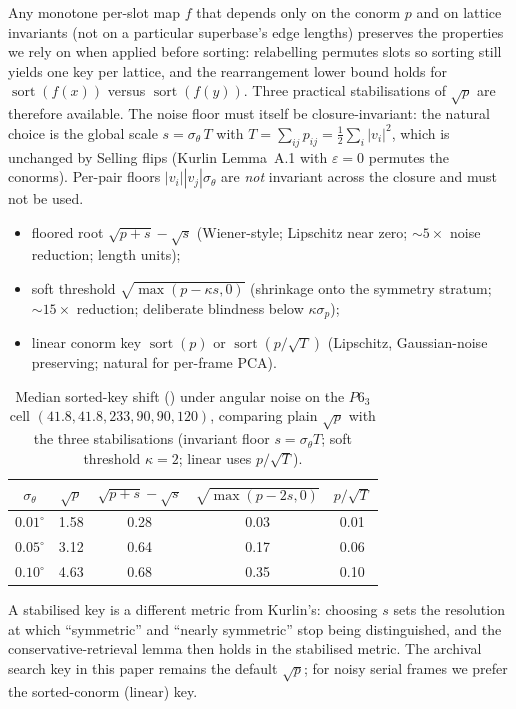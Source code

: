 \documentclass[11pt]{article}
\newcommand{\Ang}{\text{\AA}}
\begin{document}
Any monotone per-slot map $f$ that depends only on the conorm $p$ and on lattice invariants (not on a particular superbase's edge lengths) preserves the properties we rely on when applied before sorting: relabelling permutes slots so sorting still yields one key per lattice, and the rearrangement lower bound holds for $\operatorname{sort}(f(x))$ versus $\operatorname{sort}(f(y))$. Three practical stabilisations of $\sqrt{p}$ are therefore available. The noise floor must itself be closure-invariant: the natural choice is the global scale $s=\sigma_\theta\,T$ with $T=\sum_{ij}p_{ij}=\tfrac12\sum_i|v_i|^2$, which is unchanged by Selling flips (Kurlin Lemma~A.1 with $\varepsilon=0$ permutes the conorms). Per-pair floors $|v_i||v_j|\sigma_\theta$ are \emph{not} invariant across the closure and must not be used.
\begin{itemize}
\item floored root $\sqrt{p+s}-\sqrt{s}$ (Wiener-style; Lipschitz near zero; $\sim5\times$ noise reduction; length units);
\item soft threshold $\sqrt{\max(p-\kappa s,0)}$ (shrinkage onto the symmetry stratum; $\sim15\times$ reduction; deliberate blindness below $\kappa\sigma_p$);
\item linear conorm key $\operatorname{sort}(p)$ or $\operatorname{sort}(p/\sqrt{T})$ (Lipschitz, Gaussian-noise preserving; natural for per-frame PCA).
\end{itemize}
\begin{table}[h]
\centering
\caption{Median sorted-key shift (\Ang) under angular noise on the $P6_3$ cell $(41.8,41.8,233,90,90,120)$, comparing plain $\sqrt{p}$ with the three stabilisations (invariant floor $s=\sigma_\theta T$; soft threshold $\kappa=2$; linear uses $p/\sqrt{T}$).}
\begin{tabular}{ccccc}
\toprule
$\sigma_\theta$ & $\sqrt{p}$ & $\sqrt{p+s}-\sqrt{s}$ & $\sqrt{\max(p-2s,0)}$ & $p/\sqrt{T}$ \\
\midrule
$0.01^\circ$ & 1.58 & 0.28 & 0.03 & 0.01 \\
$0.05^\circ$ & 3.12 & 0.64 & 0.17 & 0.06 \\
$0.10^\circ$ & 4.63 & 0.68 & 0.35 & 0.10 \\
\bottomrule
\end{tabular}
\end{table}
A stabilised key is a different metric from Kurlin's: choosing $s$ sets the resolution at which ``symmetric'' and ``nearly symmetric'' stop being distinguished, and the conservative-retrieval lemma then holds in the stabilised metric. The archival search key in this paper remains the default $\sqrt{p}$; for noisy serial frames we prefer the sorted-conorm (linear) key.
\end{document}
